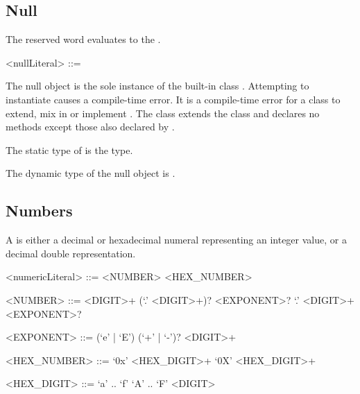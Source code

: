 \documentclass[makeidx]{article}
\begin{document}
{


\subsection{Null}

\LMHash{}%
The reserved word \NULL{} evaluates to the .

\begin{grammar}
<nullLiteral> ::= \NULL{}
\end{grammar}

\LMHash{}%
The null object is the sole instance of the built-in class .
Attempting to instantiate  causes a compile-time error.
It is a compile-time error for a class to extend, mix in or implement
.
The  class extends the  class
and declares no methods except those also declared by .


\LMHash{}%
The static type of \NULL{} is the  type.


\LMHash{}%
The dynamic type of the null object is .


\subsection{Numbers}

\LMHash{}%
A 
is either a decimal or hexadecimal numeral representing an integer value,
or a decimal double representation.

\begin{grammar}
<numericLiteral> ::= <NUMBER>
  \alt <HEX\_NUMBER>

<NUMBER> ::= <DIGIT>+ (`.' <DIGIT>+)? <EXPONENT>?
  \alt `.' <DIGIT>+ <EXPONENT>?

<EXPONENT> ::= (`e' | `E') (`+' | `-')? <DIGIT>+

<HEX\_NUMBER> ::= `0x' <HEX\_DIGIT>+
  \alt `0X' <HEX\_DIGIT>+

<HEX\_DIGIT> ::= `a' .. `f'
  \alt `A' .. `F'
  \alt <DIGIT>
\end{grammar}

}
\end{document}
